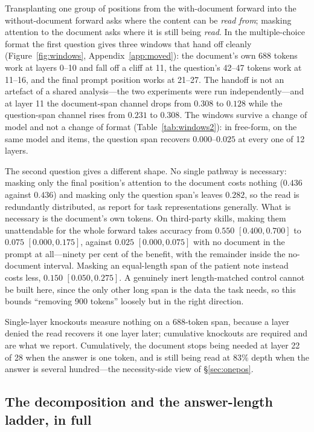 \documentclass{article}
\begin{document}
Transplanting one group of positions from the with-document forward into the
without-document forward asks where the content can be \emph{read from}; masking
attention to the document asks where it is still being \emph{read}. In the
multiple-choice format the first question gives three windows that hand off
cleanly (Figure~\ref{fig:windows}, Appendix~\ref{app:moved}): the document's own
688 tokens work at layers 0--10 and fall off a cliff at 11, the question's 42--47
tokens work at 11--16, and the final prompt position works at 21--27. The handoff
is not an artefact of a shared analysis---the two experiments were run
independently---and at layer 11 the document-span channel drops from $0.308$ to
$0.128$ while the question-span channel rises from $0.231$ to $0.308$. The
windows survive a change of model and not a change of format
(Table~\ref{tab:windows2}): in free-form, on the same model and items, the
question span recovers $0.000$--$0.025$ at every one of 12 layers.

The second question gives a different shape. No single pathway is necessary:
masking only the final position's attention to the document costs nothing
($0.436$ against $0.436$) and masking only the question span's leaves $0.282$,
so the read is redundantly distributed, as \citet{jit2025taskrepr} report for
task representations generally. What is necessary is the document's own tokens.
On third-party skills, making them unattendable for the whole forward takes
accuracy from $0.550$ $[0.400, 0.700]$ to $0.075$ $[0.000, 0.175]$, against
$0.025$ $[0.000, 0.075]$ with no document in the prompt at all---ninety per cent
of the benefit, with the remainder inside the no-document interval. Masking an
equal-length span of the patient note instead costs less, $0.150$
$[0.050, 0.275]$. A genuinely inert length-matched control cannot be built here,
since the only other long span is the data the task needs, so this bounds
``removing 900 tokens'' loosely but in the right direction.

Single-layer knockouts measure nothing on a 688-token span, because a layer
denied the read recovers it one layer later; cumulative knockouts are required
and are what we report. Cumulatively, the document stops being needed at layer
22 of 28 when the answer is one token, and is still being read at $83\%$ depth
when the answer is several hundred---the necessity-side view of
\S\ref{sec:onepos}.




\subsection{The decomposition and the answer-length ladder, in full}
\label{app:onepos}
\end{document}
